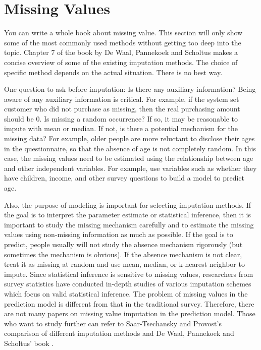 \documentclass[12pt,]{krantz}
\theoremstyle{definition}
\theoremstyle{definition}
\theoremstyle{remark}
\begin{document}
\section{Missing Values}\label{missing-values}

You can write a whole book about missing value. This section will only
show some of the most commonly used methods without getting too deep
into the topic. Chapter 7 of the book by De Waal, Pannekoek and Scholtus
\citep{Ton2011} makes a concise overview of some of the existing
imputation methods. The choice of specific method depends on the actual
situation. There is no best way.

One question to ask before imputation: Is there any auxiliary
information? Being aware of any auxiliary information is critical. For
example, if the system set customer who did not purchase as missing,
then the real purchasing amount should be 0. Is missing a random
occurrence? If so, it may be reasonable to impute with mean or median.
If not, is there a potential mechanism for the missing data? For
example, older people are more reluctant to disclose their ages in the
questionnaire, so that the absence of age is not completely random. In
this case, the missing values need to be estimated using the
relationship between age and other independent variables. For example,
use variables such as whether they have children, income, and other
survey questions to build a model to predict age.

Also, the purpose of modeling is important for selecting imputation
methods. If the goal is to interpret the parameter estimate or
statistical inference, then it is important to study the missing
mechanism carefully and to estimate the missing values using non-missing
information as much as possible. If the goal is to predict, people
usually will not study the absence mechanism rigorously (but sometimes
the mechanism is obvious). If the absence mechanism is not clear, treat
it as missing at random and use mean, median, or k-nearest neighbor to
impute. Since statistical inference is sensitive to missing values,
researchers from survey statistics have conducted in-depth studies of
various imputation schemes which focus on valid statistical inference.
The problem of missing values in the prediction model is different from
that in the traditional survey. Therefore, there are not many papers on
missing value imputation in the prediction model. Those who want to
study further can refer to Saar-Tsechansky and Provost's comparison of
different imputation methods \citep{missing1} and De Waal, Pannekoek and
Scholtus' book \citep{Ton2011}.
\end{document}
